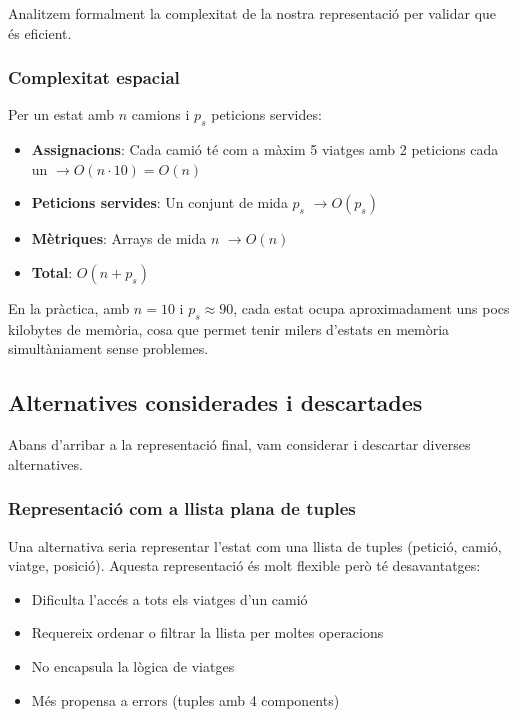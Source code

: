 Analitzem formalment la complexitat de la nostra representació per validar que és eficient.

\vspace{0.5cm}

\subsubsection{Complexitat espacial}

Per un estat amb $n$ camions i $p_s$ peticions servides:

\begin{itemize}
    \item \textbf{Assignacions}: Cada camió té com a màxim 5 viatges amb 2 peticions cada un $\rightarrow O(n \cdot 10) = O(n)$
    \item \textbf{Peticions servides}: Un conjunt de mida $p_s$ $\rightarrow O(p_s)$
    \item \textbf{Mètriques}: Arrays de mida $n$ $\rightarrow O(n)$
    \item \textbf{Total}: $O(n + p_s)$
\end{itemize}

En la pràctica, amb $n = 10$ i $p_s \approx 90$, cada estat ocupa aproximadament uns pocs kilobytes de memòria, cosa que permet tenir milers d'estats en memòria simultàniament sense problemes.


\vspace{0.5cm}

\subsection{Alternatives considerades i descartades}

Abans d'arribar a la representació final, vam considerar i descartar diverses alternatives.

\vspace{0.5cm}

\subsubsection{Representació com a llista plana de tuples}

Una alternativa seria representar l'estat com una llista de tuples (petició, camió, viatge, posició). Aquesta representació és molt flexible però té desavantatges:

\begin{itemize}
    \item Dificulta l'accés a tots els viatges d'un camió
    \item Requereix ordenar o filtrar la llista per moltes operacions
    \item No encapsula la lògica de viatges
    \item Més propensa a errors (tuples amb 4 components)
\end{itemize}

